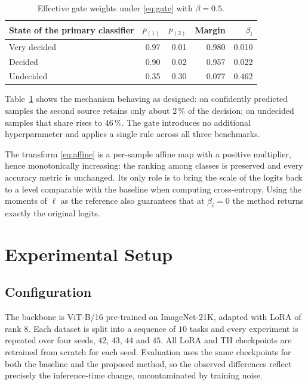 \documentclass[11pt,a4paper]{article}
\begin{document}
\begin{table}[htbp]
\centering
\caption{Effective gate weights under \eqref{eq:gate} with $\beta = 0.5$.}
\label{tab:gate-example}
\begin{tabular}{@{}lrrrr@{}}
\toprule
State of the primary classifier & $p_{(1)}$ & $p_{(2)}$ & Margin & $\beta_i$ \\
\midrule
Very decided       & 0.97 & 0.01 & 0.980 & 0.010 \\
Decided            & 0.90 & 0.02 & 0.957 & 0.022 \\
Undecided          & 0.35 & 0.30 & 0.077 & 0.462 \\
\bottomrule
\end{tabular}
\end{table}

Table~\ref{tab:gate-example} shows the mechanism behaving as designed: on
confidently predicted samples the second source retains only about $2\,\%$ of the
decision; on undecided samples that share rises to $46\,\%$. The gate introduces
no additional hyperparameter and applies a single rule across all three
benchmarks.

The transform \eqref{eq:affine} is a per-sample affine map with a positive
multiplier, hence monotonically increasing: the ranking among classes is
preserved and every accuracy metric is unchanged. Its only role is to bring the
scale of the logits back to a level comparable with the baseline when computing
cross-entropy. Using the moments of $\ell$ as the reference also guarantees that
at $\beta_i = 0$ the method returns exactly the original logits.

\section{Experimental Setup}

\subsection{Configuration}

The backbone is ViT-B/16 pre-trained on ImageNet-21K, adapted with LoRA of rank
$8$. Each dataset is split into a sequence of $10$ tasks and every experiment is
repeated over four seeds, $42$, $43$, $44$ and $45$. All LoRA and TII
checkpoints are retrained from scratch for each seed. Evaluation uses the same
checkpoints for both the baseline and the proposed method, so the observed
differences reflect precisely the inference-time change, uncontaminated by
training noise.
\end{document}
